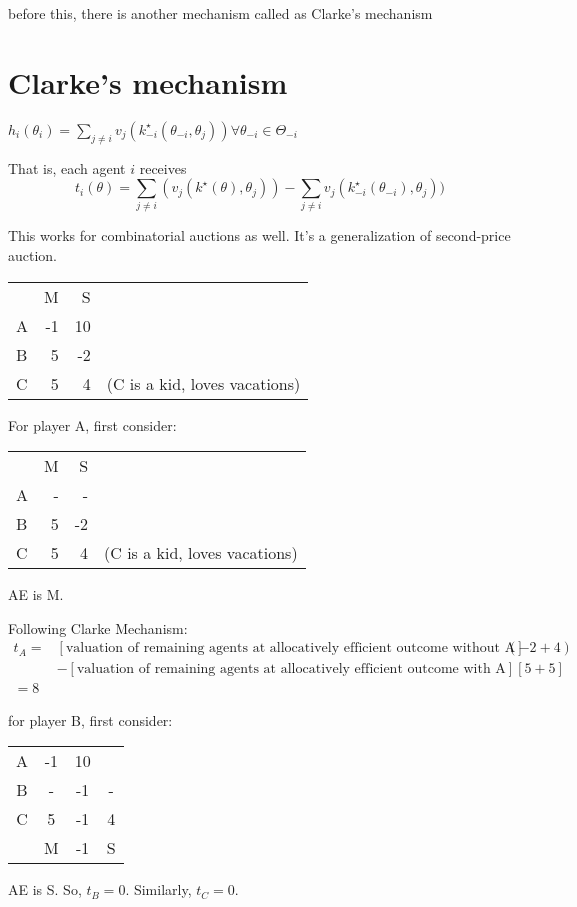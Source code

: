 \documentclass[10pt,a4paper]{article}
\begin{document}
before this, there is another mechanism called as Clarke's mechanism

\section{Clarke's mechanism}

$h_i(\theta_i) = \sum_{j \neq i} v_j(k_{-i}^\star(\theta_{-i}, \theta_j)) \forall \theta_{-i} \in \Theta_{-i}$

That is, each agent $i$ receives
$$
t_i(\theta) = \sum_{j \neq i}(v_j(k^\star(\theta), \theta_j)) - \sum_{j \neq i} v_j(k^\star_{-i}(\theta_{-i}), \theta_j))
$$

This works for combinatorial auctions as well. It's a generalization
of second-price auction.

\begin{tabular}{l r r l}
  & M & S & \\
A &-1  &10 &  \\
B & 5  &-2 & \\
C & 5 & 4 &  (C is a kid, loves vacations) \\
\end{tabular}

For player A, first consider:

\begin{tabular}{l r r l}
   & M  & S & \\
A  & -  & -  & \\
B  & 5  & -2 & \\
C  & 5  & 4  & (C is a kid, loves vacations) \\
\end{tabular}

AE is M. 

Following Clarke Mechanism:
\begin{align*}
t_A = &[\text{valuation of remaining agents at allocatively efficient outcome without A}](-2+4)  \\
     & - [\text{valuation of remaining agents at allocatively efficient outcome with A}][5+5] \\
     = 8
\end{align*}


for player B, first consider:

\begin{tabular}{cccc}
    A    & -1 &  10 & \\
B    &  - & -1 &  -   \\
C    &  5 & -1 &  4  \\
     &  M & -1 &  S 
\end{tabular}

AE is S.  So, $t_B = 0$. Similarly, $t_C = 0$.




\end{document}
